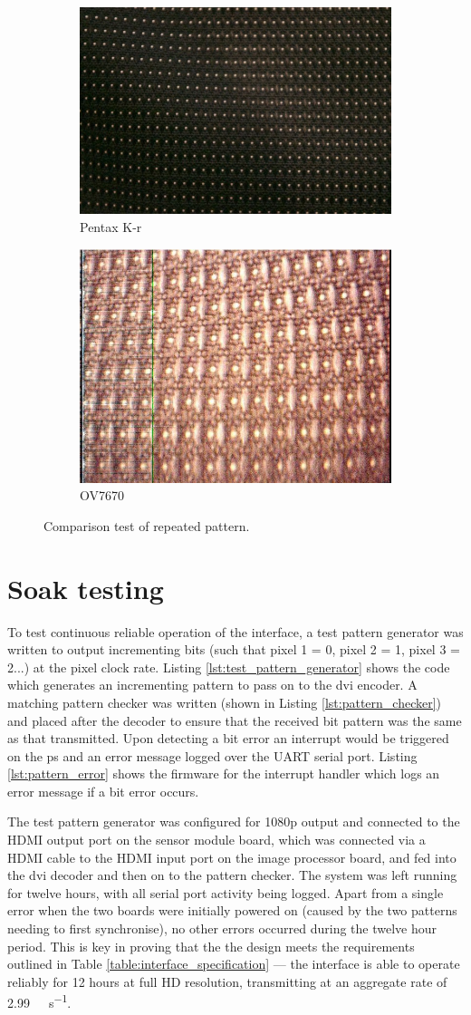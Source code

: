 \begin{figure}
\centering
\begin{subfigure}{.5\textwidth}
  \centering
  \includegraphics[width=.4\linewidth]{./img/pentax_texture.jpg}
  \caption{Pentax K-r}
\end{subfigure}%
\begin{subfigure}{.5\textwidth}
  \centering
  \includegraphics[width=.4\linewidth]{./img/ov7670_texture.jpg}
  \caption{OV7670}
\end{subfigure}
\label{fig:texture_capture}
\caption{Comparison test of repeated pattern.}
\end{figure}

\section{Soak testing}
To test continuous reliable operation of the interface, a test pattern generator was written to output incrementing bits (such that pixel 1 = 0, pixel 2 = 1, pixel 3 = 2...) at the pixel clock rate. Listing \ref{lst:test_pattern_generator} shows the code which generates an incrementing pattern to pass on to the \gls{dvi} encoder. A matching pattern checker was written (shown in Listing \ref{lst:pattern_checker}) and placed after the decoder to ensure that the received bit pattern was the same as that transmitted. Upon detecting a bit error an interrupt would be triggered on the \gls{ps} and an error message logged over the UART serial port. Listing \ref{lst:pattern_error} shows the firmware for the interrupt handler which logs an error message if a bit error occurs.

The test pattern generator was configured for 1080p output and connected to the HDMI output port on the sensor module board, which was connected via a HDMI cable to the HDMI input port on the image processor board, and fed into the \gls{dvi} decoder and then on to the pattern checker. The system was left running for twelve hours, with all serial port activity being logged. Apart from a single error when the two boards were initially powered on (caused by the two patterns needing to first synchronise), no other errors occurred during the twelve hour period. This is key in proving that the the design meets the requirements outlined in Table \ref{table:interface_specification} --- the interface is able to operate reliably for 12 hours at full HD resolution, transmitting at an aggregate rate of \SI{2.99}{\giga\bit\per\second}.

